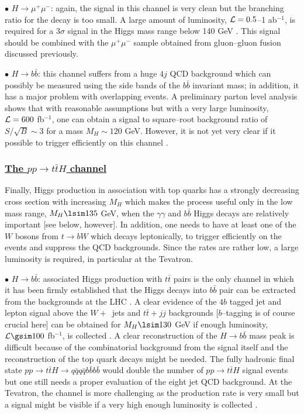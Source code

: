 $\bullet$ \underline{$H \to \mu^+\mu^-$}: again, the signal in this channel is 
very clean but the branching ratio for the decay is too small. A large amount 
of luminosity, ${\cal L}= 0.5$--1 ab$^{-1}$, is required for a  3$\sigma$ 
signal in the Higgs mass range below 140 GeV \cite{VVH-mu}. This signal should 
be combined with the $\mu^+ \mu^-$ sample obtained from gluon--gluon fusion
discussed previously.\s 

$\bullet$ \underline{$H \to b\bar{b}$}: this channel suffers from a huge $4j$
QCD background which can possibly be measured using the side bands of the
$b\bar{b}$ invariant mass; in addition, it has a major problem with overlapping
events. A preliminary parton level analysis \cite{VVH-bb} shows that with
reasonable assumptions but with a very large luminosity,  ${\cal L}= 600$
fb$^{-1}$, one can obtain a signal to square--root background ratio of
$S/\sqrt{B} \sim 3$ for a mass $M_H \sim 120$ GeV. However, it is not yet very
clear if it possible to trigger efficiently on this channel
\cite{VVH-bb-trigger}.  

\subsubsection*{\underline{The $pp \to t\bar t H$ channel}}
 
Finally, Higgs production in association with top quarks has a strongly
decreasing cross section with increasing $M_H$ which makes the process useful
only in the low mass range, $M_H \lsim 135$ GeV, when the
$\gamma \gamma$ and $b\bar b $ Higgs decays are relatively important [see
below, however]. In addition, one needs to have at least one of the $W$ bosons
from $t\to bW$ which decays leptonically, to trigger efficiently on the events 
and suppress the QCD backgrounds.
Since the rates are rather low, a large luminosity is required, in
particular at the Tevatron.\s

$\bullet$ \underline{$H \to b\bar{b}$}: associated Higgs production with $t
\bar t$ pairs \cite{pp-Htt-bb} is the only channel in which it has been firmly
established that the Higgs decays into $b\bar b $ pair can be extracted from
the backgrounds at the LHC \cite{pp-HW+Htt-Froidevaux}. A clear evidence of the
$4b$ tagged jet and lepton signal above the $W+\,$ jets and $t\bar t+jj$
backgrounds [$b$--tagging is of course crucial here] can be obtained for $M_H
\lsim 130$ GeV if enough luminosity, ${\cal L}\gsim 100$ fb$^{-1}$, is
collected \cite{pp-ttHbb-sim}. A clear reconstruction of the $H \to b \bar b$
mass peak is difficult because of the combinatorial background from the signal
itself and the reconstruction of the top quark decays might be needed.  The
fully hadronic final state $pp \to t\bar t H \to q\bar q q\bar q b\bar b b\bar
b$ would double the number of $pp \to t\bar tH$ signal events
\cite{pp-Htt-jets} but one still needs a proper evaluation of the eight jet QCD
background. At the Tevatron, the channel is more challenging as the production 
rate is very small but a signal might be visible if a very high enough 
luminosity is collected \cite{pp-Htt-phenoT,Higgs-TeV}.\s 

